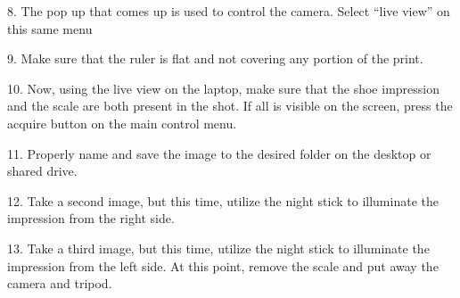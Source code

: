 8. The pop up that comes up is used to control the camera. Select “live view” on this same menu

9. Make sure that the ruler is flat and not covering any portion of the print. 

10. Now, using the live view on the laptop, make sure that the shoe impression and the scale are both present in the shot. If all is visible on the screen, press the acquire button on the main control menu. 

11. Properly name and save the image to the desired folder on the desktop or shared drive. 

12. Take a second image, but this time, utilize the night stick to illuminate the impression from the right side. 

13. Take a third image, but this time, utilize the night stick to illuminate the impression from the left side. At this point, remove the scale and put away the camera and tripod.  


